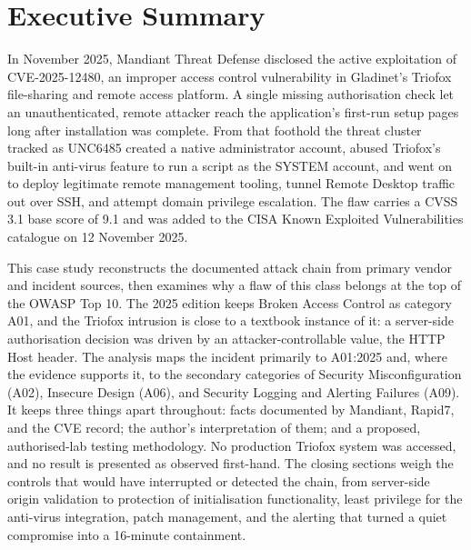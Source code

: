 \documentclass[11pt,a4paper]{article}
\newcommand{\code}[1]{{\small\ttfamily #1}}
\begin{document}
\setcounter{page}{1}

\section{Executive Summary}

In November 2025, Mandiant Threat Defense disclosed the active exploitation of CVE-2025-12480, an improper access control vulnerability in Gladinet's Triofox file-sharing and remote access platform. A single missing authorisation check let an unauthenticated, remote attacker reach the application's first-run setup pages long after installation was complete. From that foothold the threat cluster tracked as UNC6485 created a native administrator account, abused Triofox's built-in anti-virus feature to run a script as the \code{SYSTEM} account, and went on to deploy legitimate remote management tooling, tunnel Remote Desktop traffic out over SSH, and attempt domain privilege escalation. The flaw carries a CVSS 3.1 base score of 9.1 and was added to the CISA Known Exploited Vulnerabilities catalogue on 12 November 2025.

This case study reconstructs the documented attack chain from primary vendor and incident sources, then examines why a flaw of this class belongs at the top of the OWASP Top 10. The 2025 edition keeps Broken Access Control as category A01, and the Triofox intrusion is close to a textbook instance of it: a server-side authorisation decision was driven by an attacker-controllable value, the HTTP \code{Host} header. The analysis maps the incident primarily to A01:2025 and, where the evidence supports it, to the secondary categories of Security Misconfiguration (A02), Insecure Design (A06), and Security Logging and Alerting Failures (A09). It keeps three things apart throughout: facts documented by Mandiant, Rapid7, and the CVE record; the author's interpretation of them; and a proposed, authorised-lab testing methodology. No production Triofox system was accessed, and no result is presented as observed first-hand. The closing sections weigh the controls that would have interrupted or detected the chain, from server-side origin validation to protection of initialisation functionality, least privilege for the anti-virus integration, patch management, and the alerting that turned a quiet compromise into a 16-minute containment.
\end{document}
